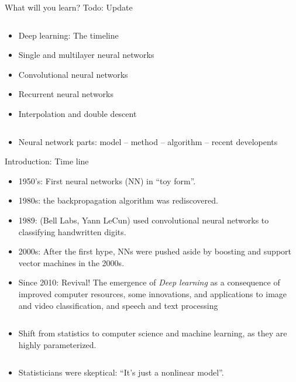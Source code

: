 \documentclass[
  10pt,
  ignorenonframetext,
]{beamer}
\providecommand{\tightlist}{%
  \setlength{\itemsep}{0pt}\setlength{\parskip}{0pt}}
\begin{document}
\begin{frame}
\begin{block}{What will you learn?}
\protect\hypertarget{what-will-you-learn}{}
Todo: Update

\(~\)

\begin{itemize}
\item
  Deep learning: The timeline
\item
  Single and multilayer neural networks
\item
  Convolutional neural networks
\item
  Recurrent neural networks
\item
  Interpolation and double descent
\end{itemize}

\(~\)

\begin{itemize}
\tightlist
\item
  Neural network parts: model -- method -- algorithm -- recent
  developents
\end{itemize}
\end{block}
\end{frame}

\begin{frame}{Introduction: Time line}
\protect\hypertarget{introduction-time-line}{}
\(~\)

\begin{itemize}
\item
  1950's: First neural networks (NN) in ``toy form''.
\item
  1980s: the backpropagation algorithm was rediscovered.
\item
  1989: (Bell Labs, Yann LeCun) used convolutional neural networks to
  classifying handwritten digits.
\item
  2000s: After the first hype, NNs were pushed aside by boosting and
  support vector machines in the 2000s.
\item
  Since 2010: Revival! The emergence of \emph{Deep learning} as a
  consequence of improved computer resources, some innovations, and
  applications to image and video classification, and speech and text
  processing
\end{itemize}

\(~\)
\end{frame}

\begin{frame}
\begin{itemize}
\tightlist
\item
  Shift from statistics to computer science and machine learning, as
  they are highly parameterized.
\end{itemize}

\(~\)

\begin{itemize}
\tightlist
\item
  Statisticians were skeptical: ``It's just a nonlinear model''.
\end{itemize}
\end{frame}
\end{document}
